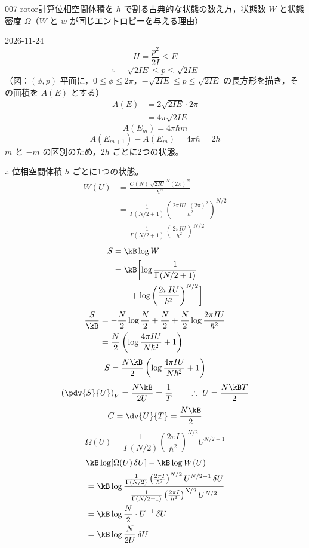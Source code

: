 \documentclass[uplatex,dvipdfmx,a4paper,11pt]{jsarticle}
\begin{document}
\begin{mondai}{007-rotor}{計算}{位相空間体積を $h$ で割る古典的な状態の数え方，状態数 $W$ と状態密度 $\Omega$（$W$ と $w$ が同じエントロピーを与える理由）}
\begin{shoumon}
\end{shoumon}
\begin{kotaeutsushi}{2026-11-24}
\[ H=\frac{p^{2}}{2I}\le E \]
\[ \therefore\ -\sqrt{2IE}\le p\le\sqrt{2IE} \]
（図：$(\phi,p)$ 平面に，$0\le\phi\le2\pi$，$-\sqrt{2IE}\le p\le\sqrt{2IE}$ の長方形を描き，その面積を $A(E)$ とする）
\begin{align*}
A(E)&=2\sqrt{2IE}\cdot2\pi\\
&=4\pi\sqrt{2IE}
\end{align*}
\[ A(E_{m})=4\pi\hbar m \]
\[ A(E_{m+1})-A(E_{m})=4\pi\hbar=2h \]
$m$ と $-m$ の区別のため，$2h$ ごとに2つの状態。

$\therefore$ 位相空間体積 $h$ ごとに1つの状態。
\begin{align*}
W(U)&=\frac{C(N)\,\sqrt{2IU}^{\,N}(2\pi)^{N}}{h^{N}}\\
&=\frac{1}{\Gamma(N/2+1)}\left(\frac{2\pi IU\cdot(2\pi)^{2}}{h^{2}}\right)^{N/2}\\
&=\frac{1}{\Gamma(N/2+1)}\left(\frac{2\pi IU}{\hbar^{2}}\right)^{N/2}
\end{align*}
\begin{align*}
S&=\kB\log W\\
&=\kB\biggl[\log\frac{1}{\Gamma(N/2+1)}\\
&\qquad+\log\left(\frac{2\pi IU}{\hbar^{2}}\right)^{N/2}\biggr]
\end{align*}
\begin{align*}
\frac{S}{\kB}&=-\frac{N}{2}\log\frac{N}{2}+\frac{N}{2}+\frac{N}{2}\log\frac{2\pi IU}{\hbar^{2}}\\
&=\frac{N}{2}\left(\log\frac{4\pi IU}{N\hbar^{2}}+1\right)
\end{align*}
\[ S=\frac{N\kB}{2}\left(\log\frac{4\pi IU}{N\hbar^{2}}+1\right) \]
\[ \left(\pdv{S}{U}\right)_{V}=\frac{N\kB}{2U}=\frac{1}{T}\qquad\therefore\ U=\frac{N\kB T}{2} \]
\[ C=\dv{U}{T}=\frac{N\kB}{2} \]
\[ \Omega(U)=\frac{1}{\Gamma(N/2)}\left(\frac{2\pi I}{\hbar^{2}}\right)^{N/2}U^{N/2-1} \]
\begin{align*}
&\kB\log[\Omega(U)\,\delta U]-\kB\log W(U)\\
&=\kB\log\frac{\frac{1}{\Gamma(N/2)}\left(\frac{2\pi I}{\hbar^{2}}\right)^{N/2}U^{N/2-1}\,\delta U}{\frac{1}{\Gamma(N/2+1)}\left(\frac{2\pi I}{\hbar^{2}}\right)^{N/2}U^{N/2}}\\
&=\kB\log\frac{N}{2}\cdot U^{-1}\,\delta U\\
&=\kB\log\frac{N}{2U}\,\delta U
\end{align*}

\end{kotaeutsushi}
\end{mondai}
\end{document}
